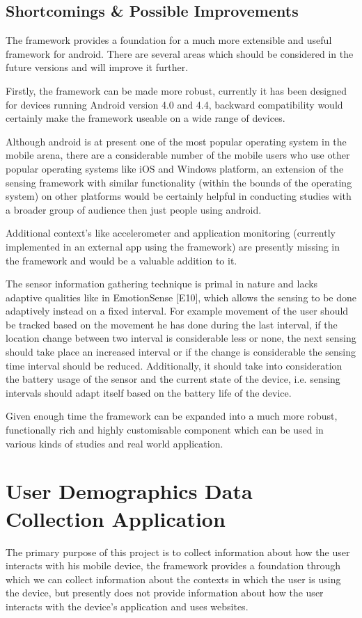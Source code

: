 \documentclass[12pt]{report}
\begin{document}
\section{Shortcomings \& Possible Improvements}
\label{contextShortcomings}
The framework provides a foundation for a much more extensible and useful framework for android. There are several areas which should be considered in the future versions and will improve it further.

Firstly, the framework can be made more robust, currently it has been designed for devices running Android version 4.0 and 4.4, backward compatibility would certainly make the framework useable on a wide range of devices. 

Although android is at present one of the most popular operating system in the mobile arena, there are a considerable number of the mobile users who use other popular operating systems like iOS and Windows platform, an extension of the sensing framework with similar functionality (within the bounds of the operating system) on other platforms would be certainly helpful in conducting studies with a broader group of audience then just people using android.

Additional context's like accelerometer and application monitoring (currently implemented in an external app using the framework) are presently missing in the framework and would be a valuable addition to it.

The sensor information gathering technique is primal in nature and lacks adaptive qualities like in EmotionSense [E10], which allows the sensing to be done adaptively instead on a fixed interval. For example movement of the user should be tracked based on the movement he has done during the last interval, if the location change between two interval is considerable less or none, the next sensing should take place an increased interval or if the change is considerable the sensing time interval should be reduced. Additionally, it should take into consideration the battery usage of the sensor and the current state of the device, i.e. sensing intervals should adapt itself based on the battery life of the device.

Given enough time the framework can be expanded into a much more robust, functionally rich and highly customisable component which can be used in various kinds of studies and real world application. 

\chapter{User Demographics Data Collection Application}
The primary purpose of this project is to collect information about how the user interacts with his mobile device, the framework provides a foundation through which we can collect information about the contexts in which the user is using the device, but presently does not provide information about how the user interacts with the device's application and uses websites.
\end{document}
